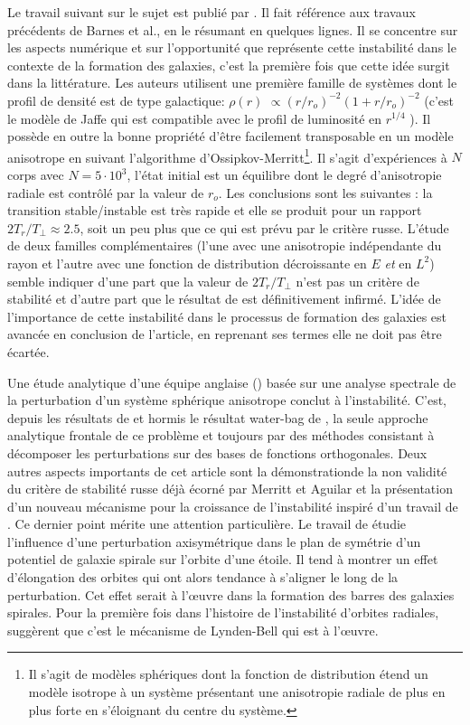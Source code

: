 Le travail suivant sur le sujet est publié par \cite{merritt_aguilar}. Il fait
référence aux travaux précédents de Barnes et al., en le résumant en quelques lignes. Il se concentre sur les aspects numérique et
sur l'opportunité que représente cette instabilité dans le contexte de la formation des galaxies, c'est la première fois que cette idée surgit dans la
littérature. Les auteurs utilisent une première famille de systèmes dont le profil de densité est \og de type galactique\fg: $\rho\left(  r\right)
$ $\propto (r/r_{o})^{-2}(1+r/r_{o})^{-2}$ (c'est le modèle de Jaffe qui est compatible avec le profil de luminosité en $r^{1/4}$ ). Il possède
en outre la bonne propriété d'être facilement transposable en un modèle anisotrope en suivant l'algorithme d'Ossipkov-Merritt\footnote{Il s'agit de
modèles sphériques dont la fonction de distribution étend un modèle isotrope à un système présentant une anisotropie radiale de plus en plus forte en
s'éloignant du centre du système.}. Il s'agit d'expériences à $N$ corps avec $N=5\cdot10^{3}$, l'état initial est un équilibre dont le degré
d'anisotropie radiale est contrôlé par la valeur de $r_{o}$. Les conclusions sont les suivantes : la transition stable/instable est très rapide et
elle se produit pour un rapport $2T_{r}/T_{\perp}\approx2.5$, soit un peu plus que ce qui est prévu par le critère russe. L'étude de deux familles
complémentaires (l'une avec une anisotropie indépendante du rayon et l'autre avec une fonction de distribution décroissante en $E$ \emph{et} en
$L^{2}$) semble indiquer d'une part que la valeur de $2T_{r}/T_{\perp}$ n'est pas un critère de stabilité et d'autre part que le résultat
de \cite{waterbag} est définitivement infirmé. L'idée de l'importance de cette instabilité dans le processus de formation des galaxies
est avancée en conclusion de l'article, en reprenant ses termes \og elle ne doit pas être écartée\fg.

Une étude analytique d'une équipe anglaise (\cite{palmerpapa}) basée sur une analyse spectrale de la perturbation d'un système sphérique anisotrope
conclut à l'instabilité. C'est, depuis les résultats de \cite{polyach} et hormis le résultat water-bag de \cite{waterbag}, la seule approche
analytique frontale de ce problème et toujours par des méthodes consistant à décomposer les perturbations sur des bases de fonctions orthogonales.
Deux autres aspects importants de cet article sont la \og démonstration\fg de la non validité du critère de stabilité russe déjà écorné par Merritt
et Aguilar et la présentation d'un nouveau mécanisme pour la croissance de l'instabilité inspiré d'un travail de \cite{lyndenbell}. Ce dernier point
mérite une attention particulière. Le travail de \cite{lyndenbell} étudie l'influence d'une perturbation axisymétrique dans le plan de symétrie d'un
potentiel de galaxie spirale sur l'orbite d'une étoile. Il tend à montrer un effet d'élongation des orbites qui ont alors tendance à s'aligner le long
de la perturbation. Cet effet serait à l'œuvre dans la formation des barres des galaxies spirales. Pour la première fois dans l'histoire de
l'instabilité d'orbites radiales, \cite{palmerpapa} suggèrent que c'est le mécanisme de Lynden-Bell qui est à l'œuvre.

